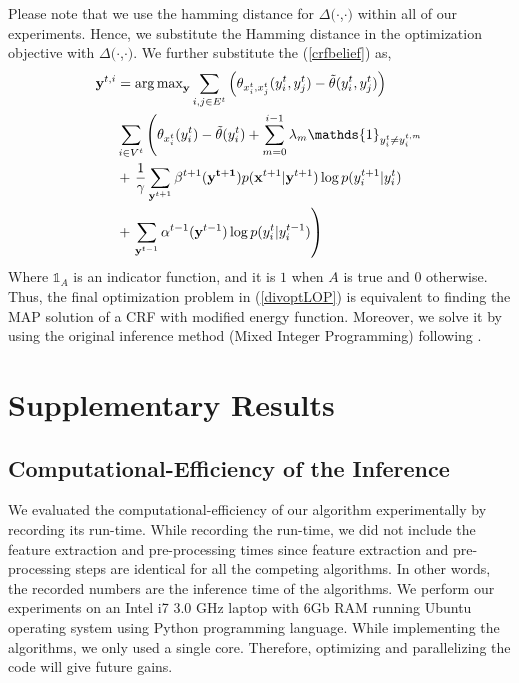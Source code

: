 \documentclass[conference]{IEEEtran}
\newcommand{\argmax}{\operatorname{arg\,max}}
\begin{document}
Please note that we use the hamming distance for $\Delta(\cdot$,$\cdot)$ within all of our experiments. Hence, we substitute the Hamming distance in the optimization objective with $\Delta(\cdot$,$\cdot)$. We further substitute the (\ref{crfbelief})  as,
\begin{equation}\small
\begin{aligned}
\mathbf{y}^{t,i} &= \argmax_{\mathbf{y}}  \sum_{i,j \in E^t} \left( \theta_{x^t_i,x^t_j}(y^t_i,y^t_j) - \tilde{\theta}(y^t_i,y^t_j) \right) \\
&\sum_{i \in V^t} \left( \theta_{x^t_i}(y^t_i) - \tilde{\theta}(y^t_i) + \sum_{m=0}^{i-1} \lambda_m \mathds{1}_{y^{t}_i \neq y^{t,m}_i} \right. \\
&+\left.\frac{1}{\gamma}\sum_{\mathbf{y}^{t+1}} \beta^{t+1}(\mathbf{y^{t+1}}) p(\mathbf{x}^{t+1}|\mathbf{y}^{t+1}) \log p(y^{t+1}_i|y^{t}_i)  \right.\\
&+ \left.  \sum_{\mathbf{y}^{t-1}} \alpha^{t-1}(\mathbf{y}^{t-1}) \log p(y^t_i|y^{t-1}_i) \right)
\end{aligned}
\label{divoptLOP}
\end{equation}
Where $\mathds{1}_A$ is an indicator function, and it is $1$ when $A$ is true and $0$ otherwise. Thus, the final optimization problem in (\ref{divoptLOP}) is equivalent to finding the MAP solution of a CRF with modified energy function. Moreover, we solve it by using the original inference method (Mixed Integer Programming) following \cite{hemaIJRR}.

\section{Supplementary Results}
\subsection{Computational-Efficiency of the Inference}
We evaluated the computational-efficiency of our algorithm experimentally by recording its run-time. While recording the run-time, we did not include the feature extraction and pre-processing times since feature extraction and pre-processing steps are identical for all the competing algorithms. In other words, the recorded numbers are the inference time of the algorithms. We perform our experiments on an Intel i7 3.0 GHz laptop with 6Gb RAM running Ubuntu operating system using Python programming language. While implementing the algorithms, we only used a single core. Therefore, optimizing and parallelizing the code will give future gains.
\end{document}
